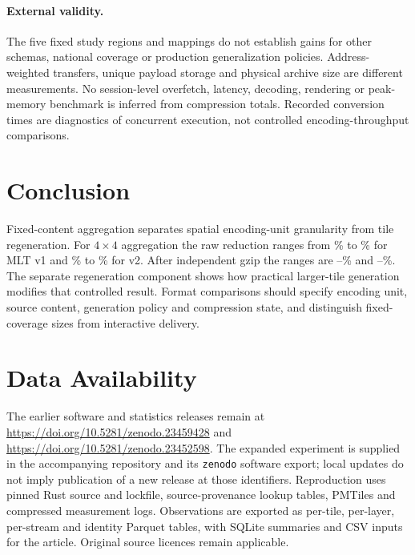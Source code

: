 \paragraph{External validity.}
The five fixed study regions and mappings do not establish gains for other schemas,
national coverage or production generalization policies. Address-weighted transfers,
unique payload storage and physical archive size are different measurements. No
session-level overfetch, latency, decoding, rendering or peak-memory benchmark is
inferred from compression totals.
Recorded conversion times are diagnostics of concurrent execution, not controlled
encoding-throughput comparisons.

\section{Conclusion}\label{sec:conclusion}
Fixed-content aggregation separates spatial encoding-unit granularity from tile
regeneration. For $4\times4$ aggregation the raw reduction ranges from
\ExtOneRawAggregationMin\% to \ExtOneRawAggregationMax\% for MLT v1 and
\ExtTwoRawAggregationMin\% to \ExtTwoRawAggregationMax\% for v2. After independent
gzip the ranges are \ExtOneGzipAggregationMin--\ExtOneGzipAggregationMax\% and
\ExtTwoGzipAggregationMin--\ExtTwoGzipAggregationMax\%. The separate regeneration
component shows how practical larger-tile generation modifies that controlled result.
Format comparisons should specify encoding unit, source content, generation policy
and compression state, and distinguish fixed-coverage sizes from interactive delivery.

\section*{Data Availability}\label{sec:data-availability}
The earlier software and statistics releases remain at
\url{https://doi.org/10.5281/zenodo.23459428} and
\url{https://doi.org/10.5281/zenodo.23452598}.
The expanded experiment is supplied in the accompanying repository and its
\texttt{zenodo} software export; local updates do not imply publication of a new
release at those identifiers. Reproduction uses pinned Rust source and lockfile,
source-provenance lookup tables, PMTiles and compressed measurement logs. Observations
are exported as per-tile, per-layer, per-stream and identity Parquet tables, with
SQLite summaries and CSV inputs for the article. Original source licences remain
applicable.
